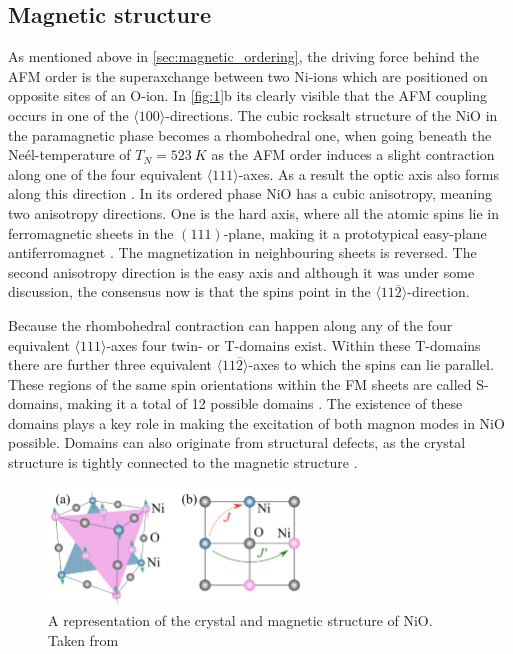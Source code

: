 \subsection{Magnetic structure}
As mentioned above in \autoref{sec:magnetic_ordering}, the driving force behind the AFM order is the superaxchange between two Ni-ions which are positioned on opposite sites of an O-ion.
In \autoref{fig:1}b its clearly visible that the AFM coupling occurs in one of the $\langle100\rangle$-directions.
The cubic rocksalt structure of the NiO in the paramagnetic phase becomes a rhombohedral one, when going beneath the Neél-temperature of $T_N = \qty{523}{K}$ as the AFM order induces a slight contraction along one of the four equivalent $\langle111\rangle$-axes.
As a result the optic axis also forms along this direction .
In its ordered phase NiO has a cubic anisotropy, meaning two anisotropy directions.
One is the hard axis, where all the atomic spins lie in ferromagnetic sheets in the $(111)$-plane, making it a prototypical easy-plane antiferromagnet .
The magnetization in neighbouring sheets is reversed.
The second anisotropy direction is the easy axis and although it was under some discussion, the consensus now is  that the spins point in the $\langle11\overline{2}\rangle$-direction.

Because the rhombohedral contraction can happen along any of the four equivalent $\langle111\rangle$-axes four twin- or T-domains exist.
Within these T-domains there are further three equivalent $\langle11\overline{2}\rangle$-axes to which the spins can lie parallel.
These regions of the same spin orientations within the FM sheets are called S-domains, making it a total of 12 possible domains .
The existence of these domains plays a key role in making the excitation of both magnon modes in NiO possible.
Domains can also originate from structural defects, as the crystal structure is tightly connected to the magnetic structure .
\begin{figure}[ht]
    \centering
    \includegraphics[width=0.6\textwidth]{pictures/1.png}
    \caption{A representation of the crystal and magnetic structure of NiO. Taken from }
    \label{fig:1}
\end{figure}
\FloatBarrier

